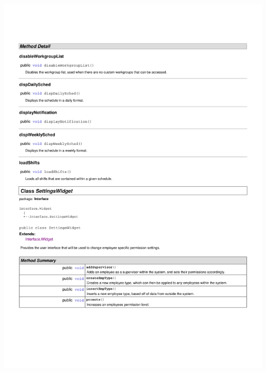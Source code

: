 \documentclass[letterpaper,12pt]{report}
\begin{document}
\includegraphics[scale=0.9,trim=20mm 30mm 25mm 25mm]{externals/InterfaceDataDictionary9.pdf}
\newpage
\end{document}
